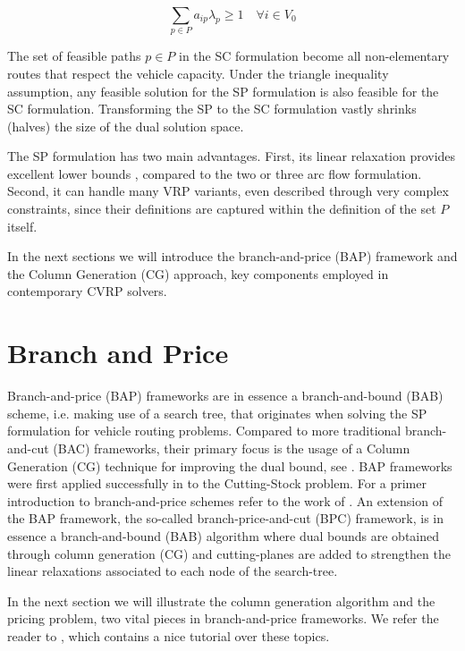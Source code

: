 \begin{equation}\label{eq:set-covering-customers-visited-by-exactly-one-route}
	\sum_{p \in P}  a_{ip} \lambda_p \ge 1  \quad \forall i \in V_0
\end{equation}

The set of feasible paths $p \in P$ in the SC formulation become all non-elementary routes that respect the vehicle capacity.
Under the triangle inequality assumption, any feasible solution for the SP formulation is also feasible for the SC formulation.
Transforming the SP to the SC formulation vastly shrinks (halves) the size of the dual solution space.

\medskip


The SP formulation has two main advantages.
First, its linear relaxation provides excellent lower bounds \parencite{bramel1997},
compared to the two or three arc flow formulation.
Second, it can handle many VRP variants,
even described through very complex constraints,
since their definitions are captured within the definition of the set $P$ itself.


\medskip

In the next sections we will introduce
the branch-and-price (BAP) framework and the Column Generation (CG) approach,
key components employed in contemporary CVRP solvers.


\section{Branch and Price}
\label{sec:intro-branch-and-price}

Branch-and-price (BAP) frameworks are in essence a branch-and-bound (BAB) scheme,
i.e. making use of a search tree,
that originates when solving the SP formulation for vehicle routing problems.
Compared to more traditional branch-and-cut (BAC) frameworks,
their primary focus is the usage of a Column Generation (CG) technique for improving the dual bound,
see \textcite{righini2008}.
BAP frameworks were first applied successfully in \textcite{gilmore1961} to the Cutting-Stock problem.
For a primer introduction to branch-and-price schemes refer to the work of \textcite{barnhart1998}.
An extension of the BAP framework, the so-called branch-price-and-cut (BPC) framework,
is in essence a branch-and-bound (BAB) algorithm where dual bounds are obtained through column generation (CG)
and cutting-planes are added to strengthen the linear relaxations associated to each node of the search-tree.

In the next section we will illustrate the column generation algorithm
and the pricing problem, two vital pieces in branch-and-price frameworks.
We refer the reader to \textcite{feillet2010}, which contains a nice
tutorial over these topics.



